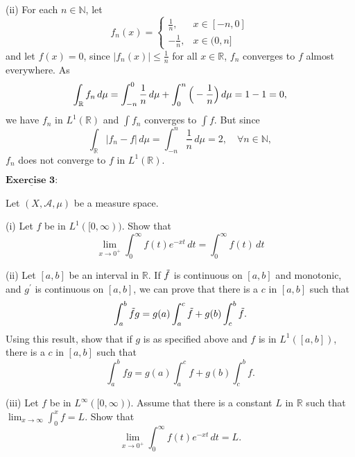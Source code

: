 \documentclass[12pt,a4paper]{ctexart}
\begin{document}
(ii) For each $n \in \mathbb N$, let
\begin{equation*}
f_{n} (x) =
\left\{
             \begin{array}{cl}
             \frac{1}{n}, & x \in [-n, 0] \\
             - \frac{1}{n}, & x \in (0, n]
             \end{array}
\right.
\end{equation*}
and let $f(x) = 0$, since $|f_{n}(x)| \leq \frac{1}{n}$ for all $x \in \mathbb R$, $f_{n}$ converges to $f$ almost everywhere. As
\begin{equation*}
    \int_{\mathbb{R}}^{} f_{n} \, d \mu = \int_{-n}^{0} \frac{1}{n} \, d \mu + \int_{0}^{n} \Big{(} - \frac{1}{n} \Big{)} \, d \mu = 1 - 1 = 0,
\end{equation*}
we have $f_{n}$ in $L^{1}(\mathbb{R})$ and $\int f_{n}$ converges to $\int f$. But since
\begin{equation*}
    \int_{\mathbb{R}}^{} |f_{n} - f| \, d \mu = \int_{-n}^{n} \frac{1}{n} \, d \mu = 2, \quad \forall n \in \mathbb N,
\end{equation*}
$f_{n}$ does not converge to $f$ in $L^{1}(\mathbb{R})$.


\newpage

$\underline{\textbf{Exercise 3:}}$

Let $(X, \mathcal{A}, \mu)$ be a measure space.

(i) Let $f$ be in $L^{1}([0, \infty))$. Show that
\begin{equation*}
    \lim_{x \to 0^{+}} \int_{0}^{\infty} f(t) e^{- x t} \, d t = \int_{0}^{\infty} f(t) \, d t
\end{equation*}

(ii) Let $[a, b]$ be an interval in $\mathbb{R}$. If $\Tilde{f}$ is continuous on $[a, b]$ and monotonic, and $g^{'}$ is continuous on $[a, b]$, we can prove that there is a $c$ in $[a, b]$ such that
\begin{equation*}
    \int_{a}^{b} \Tilde{f} g = g(a) \int_{a}^{c} \Tilde{f} + g(b) \int_{c}^{b} \Tilde{f}.
\end{equation*}
Using this result, show that if $g$ is as specified above and $f$ is in $L^{1}([a, b])$, there is a $c$ in $[a, b]$ such that 
\begin{equation*}
    \int_{a}^{b} f g = g(a) \int_{a}^{c} f + g(b) \int_{c}^{b} f.
\end{equation*}

(iii) Let $f$ be in $L^{\infty}([0, \infty))$. Assume that there is a constant $L$ in $\mathbb{R}$ such that $\lim_{x \to \infty} \int_{0}^{x} f = L$. Show that 
\begin{equation*}
    \lim_{x \to 0^{+}} \int_{0}^{ \infty} f(t) e^{- x t} \, d t = L.
\end{equation*}
\end{document}
